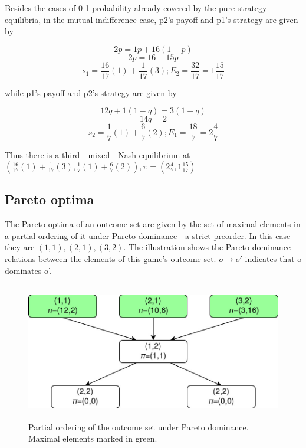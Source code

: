 \documentclass[12pt, a4paper]{article}
\begin{document}
Besides the cases of 0-1 probability already covered by the pure strategy equilibria, in the mutual indifference case, p2's payoff and p1's strategy are given by 

\begin{equation}
    2p=1p+16(1-p)
\end{equation}
\begin{equation}
    2p=16-15p
\end{equation}
\begin{equation}
    s_1=\frac{16}{17}(1)+\frac{1}{17}(3);E_2=\frac{32}{17}=1\frac{15}{17}
\end{equation}

while p1's payoff and p2's strategy are given by 

\begin{equation}
    12q+1(1-q)=3(1-q)
\end{equation}
\begin{equation}
    14q=2
\end{equation}
\begin{equation}
    s_2=\frac{1}{7}(1)+\frac{6}{7}(2);E_1=\frac{18}{7}=2\frac{4}{7}
\end{equation}

Thus there is a third - mixed - Nash equilibrium at $(\frac{16}{17}(1)+\frac{1}{17}(3), \frac{1}{7}(1)+\frac{6}{7}(2)), \pi=(2\frac{4}{7}, 1\frac{15}{17})$

\subsection{Pareto optima}

The Pareto optima of an outcome set are given by the set of maximal elements in a partial ordering of it under Pareto dominance - a strict preorder. In this case they are $(1,1), (2,1), (3,2)$. The illustration shows the Pareto dominance relations between the elements of this game's outcome set. $o \rightarrow o'$ indicates that o dominates o'.

\begin{figure}[h!]
    \centering
    \includegraphics[height=6cm]{poset.jpeg}
    \caption{Partial ordering of the outcome set under Pareto dominance. Maximal elements marked in green.}
\end{figure}
\end{document}
